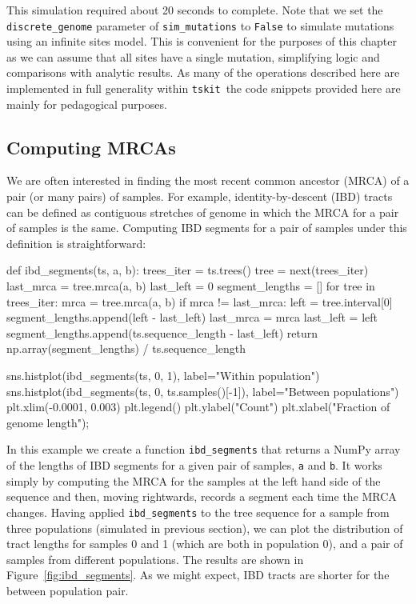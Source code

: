 \documentclass[graybox]{svmult}
\newcommand{\tskit}[0]{\texttt{tskit}}
\begin{document}
This simulation required about 20 seconds to complete. Note that we set the
\texttt{discrete\_genome} parameter of \texttt{sim\_mutations} to
\texttt{False} to simulate mutations using an infinite sites model.
This is convenient for the purposes of this chapter as we can assume
that all sites have a single mutation, simplifying logic 
and comparisons with analytic results. As many
of the operations described here are implemented in full generality
within \tskit\, the code snippets provided here are mainly for pedagogical
purposes.

\subsection{Computing MRCAs}\label{computing-mrcas}
We are often interested in finding the most recent common ancestor (MRCA)
of a pair (or many pairs) of samples. For example, identity-by-descent
(IBD) tracts can be defined as contiguous stretches of genome in which the
MRCA for a pair of samples is the same. Computing IBD segments for a
pair of samples under this definition is straightforward:

\begin{pythoncode}
def ibd_segments(ts, a, b):
    trees_iter = ts.trees()
    tree = next(trees_iter)
    last_mrca = tree.mrca(a, b)
    last_left = 0
    segment_lengths = []
    for tree in trees_iter:
        mrca = tree.mrca(a, b)
        if mrca != last_mrca:
            left = tree.interval[0]
            segment_lengths.append(left - last_left)
            last_mrca = mrca
            last_left = left
    segment_lengths.append(ts.sequence_length - last_left)
    return np.array(segment_lengths) / ts.sequence_length

sns.histplot(ibd_segments(ts, 0, 1),
    label="Within population")
sns.histplot(ibd_segments(ts, 0, ts.samples()[-1]),
    label="Between populations")
plt.xlim(-0.0001, 0.003)
plt.legend()
plt.ylabel("Count")
plt.xlabel("Fraction of genome length");
\end{pythoncode}


In this example we create a function \texttt{ibd\_segments} that returns
a NumPy array of the lengths of IBD segments for a given pair of
samples, \texttt{a} and \texttt{b}. It works simply by computing the
MRCA for the samples at the left hand side of the sequence and then,
moving rightwards, records a segment each time the MRCA changes. Having 
applied \texttt{ibd\_segments} to the tree sequence for a sample from three populations (simulated in previous section),
we can plot the distribution of tract lengths for samples 0 and 1 (which are
both in population 0), and a pair of
samples from different populations. The results are shown in
Figure~\ref{fig:ibd_segments}. As we might expect, IBD tracts
are shorter for the between population pair.
\end{document}
